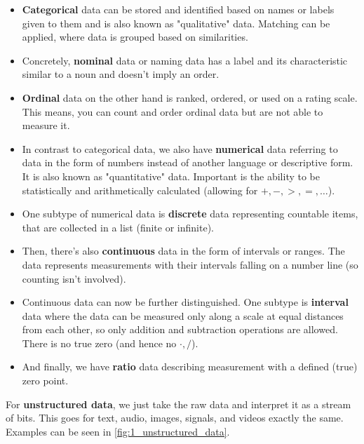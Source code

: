 \begin{itemize}
  \item {}\textbf{Categorical} data can be stored and identified based on names or labels given to them and is also known as "qualitative" data. Matching can be applied, where data is grouped based on similarities.
  
  \item Concretely, \textbf{nominal} data or naming data has a label and its characteristic similar to a noun and doesn't imply an order.
  
  \item {}\textbf{Ordinal} data on the other hand is ranked, ordered, or used on a rating scale. This means, you can count and order ordinal data but are not able to measure it.
  
  \item In contrast to categorical data, we also have \textbf{numerical} data referring to data in the form of numbers instead of another language or descriptive form. It is also known as "quantitative" data. Important is the ability to be statistically and arithmetically calculated (allowing for $+, -, >, =, \dots$).
  
  \item One subtype of numerical data is \textbf{discrete} data representing countable items, that are collected in a list (finite or infinite).
  
  \item Then, there's also \textbf{continuous} data in the form of intervals or ranges. The data represents measurements with their intervals falling on a number line (so counting isn't involved).
  
  \item Continuous data can now be further distinguished. One subtype is \textbf{interval} data where the data can be measured only along a scale at equal distances from each other, so only addition and subtraction operations are allowed. There is no true zero (and hence no $\cdot, /$).
  
  \item And finally, we have \textbf{ratio} data describing measurement with a defined (true) zero point.
\end{itemize}

For \textbf{unstructured data}, we just take the raw data and interpret it as a stream of bits. This goes for text, audio, images, signals, and videos exactly the same. Examples can be seen in \ref{fig:1_unstructured_data}.

